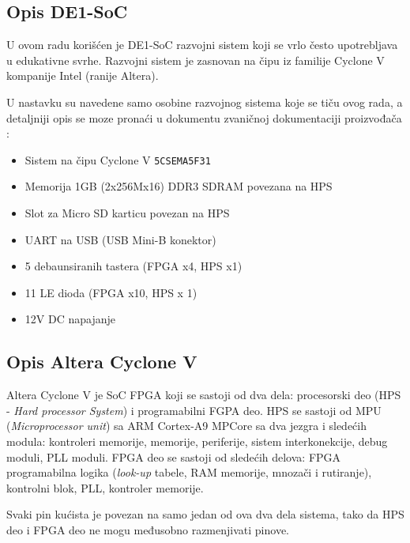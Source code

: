 \subsection{Opis DE1-SoC}

U ovom radu korišćen je DE1-SoC razvojni sistem koji se vrlo često upotrebljava u edukativne svrhe. Razvojni sistem je zasnovan na čipu iz familije Cyclone V kompanije Intel (ranije Altera).

U nastavku su navedene samo osobine razvojnog sistema koje se tiču ovog rada, a detaljniji opis se moze pronaći u dokumentu zvaničnoj dokumentaciji proizvođača \cite{de1}: 
\begin{itemize}
\item Sistem na čipu Cyclone V \texttt{5CSEMA5F31}
\item Memorija 1GB (2x256Mx16) DDR3 SDRAM povezana na HPS
\item Slot za Micro SD karticu povezan na HPS
\item UART na USB (USB Mini-B konektor)
\item 5 debaunsiranih tastera (FPGA x4, HPS x1)
\item 11 LE dioda (FPGA x10, HPS x 1)
\item 12V DC napajanje
\end{itemize}

\subsection{Opis Altera Cyclone V}
Altera Cyclone V je SoC FPGA koji se sastoji od dva dela: procesorski deo (HPS -  \textit{Hard processor System}) i programabilni FGPA deo. HPS se sastoji od MPU (\textit{Microprocessor unit}) sa ARM Cortex-A9 MPCore sa dva jezgra i sledećih modula: kontroleri memorije, memorije, periferije, sistem interkonekcije, debug moduli, PLL moduli. FPGA deo se sastoji od sledećih delova: FPGA programabilna logika (\textit{look-up} tabele, RAM memorije, mnozači i rutiranje), kontrolni blok, PLL, kontroler memorije.

Svaki pin kućista je povezan na samo jedan od ova dva dela sistema, tako da HPS deo i FPGA deo ne mogu međusobno razmenjivati pinove.

